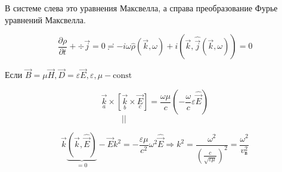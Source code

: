 \documentclass[12pt, a4paper]{report}
\begin{document}
В системе слева это уравнения Максвелла, а справа преобразование Фурье уравнений Максвелла.


\[ \frac{ \partial \rho }{ \partial t } + \mathrm{ \div  } \vec{ j }  = 0 \risingdotseq - i \omega \hat{ \rho } ( \vec{k }, \omega) + i ( \vec{k }, \hat{\vec{j}} ( \vec{k }, \omega) ) = 0      \] 

Если \( \vec{B} = \mu \vec{H } , \vec{D } = \varepsilon \vec{ E } , \varepsilon , \mu  - \mathrm{const}   \)

\[ \underset{a}{\vec{k}} \times \left[ \underset{b}{\vec{k} }\times \underset{c}{\vec{E}}  \right] = \frac{\omega \mu}{c }  \left( - \frac{\omega}{ c } \varepsilon \hat{\vec{E}}  \right)
\] 
\( \quad \quad \quad \quad \quad \quad \quad \quad \quad \quad \quad \quad \quad \quad || \) 

\[ \vec{k } \underbrace{( \vec{k }, \hat{\vec{E }})}_{=0} - \hat{ \vec{ E } } k ^2 = - \frac{\varepsilon \mu }{c ^2 } \omega ^2 \hat{\vec{E }} \Rightarrow k ^2 = \frac{ \omega ^2 }{\left( \frac{c}{\sqrt{\varepsilon \mu}}      \right) ^2} = \frac{\omega ^2 }{v ^2 _{\text{в} } }       \] 



\ifdefined\mainfile
\else
    
\end{document}
